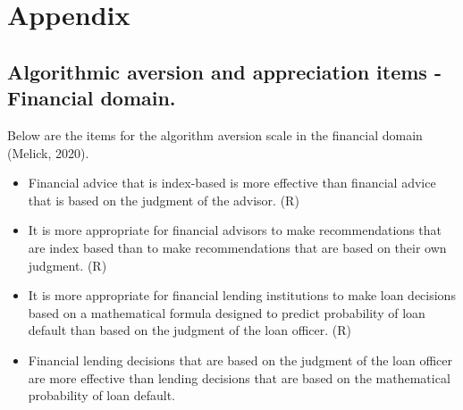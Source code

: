 \documentclass[
  man ,floatsintext]{apa7}
\begin{document}
\newpage

\hypertarget{appendix}{%
\section{Appendix}\label{appendix}}

\hypertarget{algorithmic-aversion-and-appreciation-items---financial-domain.}{%
\subsection{Algorithmic aversion and appreciation items - Financial domain.}\label{algorithmic-aversion-and-appreciation-items---financial-domain.}}

Below are the items for the algorithm aversion scale in the financial domain (Melick, 2020).

\begin{itemize}
\item
  Financial advice that is index-based is more effective than financial advice that is based on the judgment of the advisor. (R)
\item
  It is more appropriate for financial advisors to make recommendations that are index based than to make recommendations that are based on their own judgment. (R)
\item
  It is more appropriate for financial lending institutions to make loan decisions based on a mathematical formula designed to predict probability of loan default than based on the judgment of the loan officer. (R)
\item
  Financial lending decisions that are based on the judgment of the loan officer are more effective than lending decisions that are based on the mathematical probability of loan default.
\end{itemize}
\end{document}

